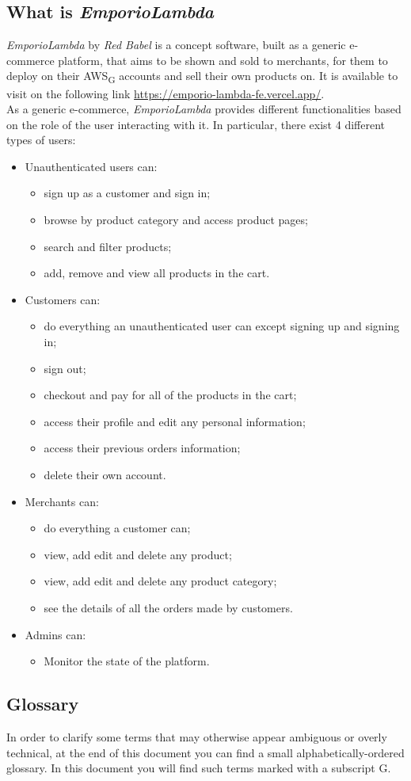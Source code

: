\subsection{What is \textit{EmporioLambda}}
\textit{EmporioLambda} by \textit{Red Babel} is a concept software, built as a generic e-commerce platform, that aims to be shown and sold to merchants, for them to deploy on their AWS\textsubscript{G} accounts and sell their own products on. It is available to visit on the following link \url{https://emporio-lambda-fe.vercel.app/}.\\
As a generic e-commerce, \textit{EmporioLambda} provides different functionalities based on the role of the user interacting with it. In particular, there exist 4 different types of users:
\begin{itemize}
\item Unauthenticated users can:
\begin{itemize}
\item sign up as a customer and sign in;
\item browse by product category and access product pages;
\item search and filter products;
\item add, remove and view all products in the cart.
\end{itemize}
\item Customers can:
\begin{itemize}
\item do everything an unauthenticated user can except signing up and signing in;
\item sign out;
\item checkout and pay for all of the products in the cart;
\item access their profile and edit any personal information;
\item access their previous orders information;
\item delete their own account.
\end{itemize}
\item Merchants can:
\begin{itemize}
\item do everything a customer can;
\item view, add edit and delete any product;
\item view, add edit and delete any product category;
\item see the details of all the orders made by customers.
\end{itemize}
\item Admins can:
\begin{itemize}
\item Monitor the state of the platform.
\end{itemize}
\end{itemize}
\subsection{Glossary}
In order to clarify some terms that may otherwise appear ambiguous or overly technical, at the end of this document you can find a small alphabetically-ordered glossary. In this document you will find such terms marked with a subscript G.
